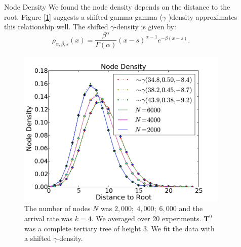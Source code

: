 \documentclass[final]{beamer}
\newcommand{\bb}[1]{\textbf{#1}}
\newlength{\sepwid}
\newlength{\onecolwid}
\begin{document}
\begin{frame}[t]
\begin{columns}[t]
\begin{column}{\onecolwid}
\begin{block}{Node Density}
We found the node density depends on the distance to the root.  Figure [\ref{nd}] suggests a shifted gamma gamma ($\gamma$-)density approximates this relationship well.  The shifted $\gamma$-density is given by:
$$
\rho_{\alpha, \beta, s}(x) = \frac{\beta^\alpha}{\Gamma(\alpha)}(x - s)^{\alpha-1}e^{ -\beta (x-s)}.
$$
\begin{figure}
\includegraphics[width=0.8\linewidth]{nodedensity.pdf}
\caption{The number of nodes $N $ was $2,000; \; 4,000;\;6,000$ and the arrival rate was $k = 4$.  We averaged over 20 experiments.  $\bb T^0$ was a complete tertiary tree of height 3.  We fit the data with a shifted $\gamma$-density.}
\label{nd}
\end{figure}
\end{block}
\end{column}


\begin{column}{\sepwid}\end{column}			%



    

\begin{column}{\onecolwid}


\end{column}
\end{columns}
\end{frame}
\end{document}
